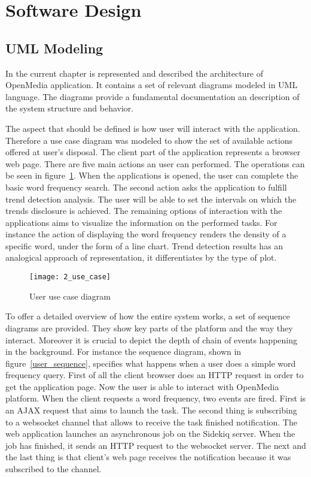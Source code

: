 \section{Software Design}
\subsection{UML Modeling}
In the current chapter is represented and described the architecture of OpenMedia application. It contains a set of relevant diagrams modeled in UML language. The diagrams provide a fundamental documentation an description of the system structure and behavior.

The aspect that should be defined is how user will interact with the application. Therefore a use case diagram was modeled to show the set of available actions offered at user's disposal. The client part of the application represents a browser web page. There are five main actions an user can performed. The operations can be seen in \mbox{figure \ref{use_case}}. When the applications is opened, the user can complete the basic word frequency search. The second action asks the application to fulfill trend detection analysis. The user will be able to set the intervals on which the trends disclosure is achieved. The remaining options of interaction with the applications aims to visualize the information on the performed tasks. For instance the action of displaying the word frequency renders the density of a specific word, under the form of a line chart. Trend detection results has an analogical approach of representation, it differentiates by the type of plot.

\begin{figure}[!ht]
\centering
\texttt{[image: 2\_use\_case]}
\caption{User use case diagram}\label{use_case}
\end{figure}

To offer a detailed overview of how the entire system works, a set of sequence diagrams are provided. They show key parts of the platform and the way they interact. Moreover it is crucial to depict the depth of chain of events happening in the background. For instance the sequence diagram, shown in \mbox{figure \ref{user_sequence}}, specifies what happens when a user does a simple word frequency query. First of all the client browser does an HTTP request in order to get the application page. Now the user is able to interact with OpenMedia platform. When the client requests a word frequency, two events are fired. First is an AJAX request that aims to launch the task. The second thing is subscribing to a websocket channel that allows to receive the task finished notification. The web application launches an asynchronous job on the Sidekiq server. When the job has finished, it sends an HTTP request to the websocket server. The next and the last thing is that client's web page receives the notification because it was subscribed to the channel.

